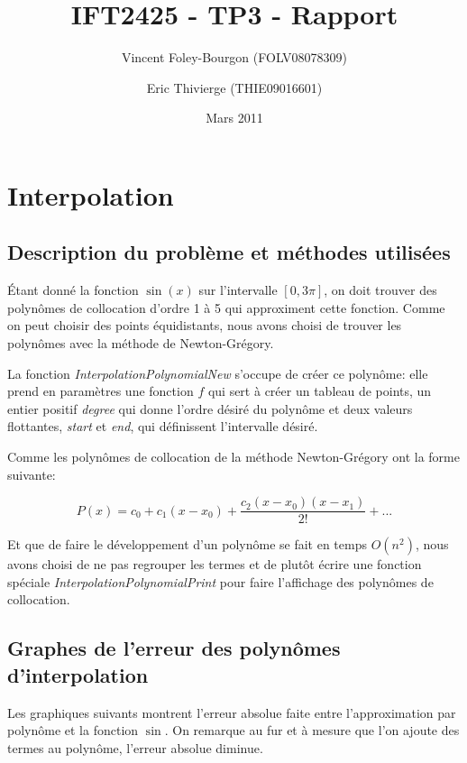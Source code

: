 \documentclass[10pt]{article}
\begin{document}
\title{IFT2425 - TP3 - Rapport}
\date{Mars 2011}
\author{Vincent Foley-Bourgon (FOLV08078309) \and
  Eric Thivierge (THIE09016601)}

\maketitle

\section{Interpolation}

\subsection{Description du problème et méthodes utilisées}

Étant donné la fonction $\sin(x)$ sur l'intervalle $[0, 3\pi]$, on doit
trouver des polynômes de collocation d'ordre 1 à 5 qui approximent
cette fonction.  Comme on peut choisir des points équidistants, nous
avons choisi de trouver les polynômes avec la méthode de
Newton-Grégory.

La fonction \emph{InterpolationPolynomialNew} s'occupe de créer ce
polynôme: elle prend en paramètres une fonction $f$ qui sert à créer
un tableau de points, un entier positif \emph{degree} qui donne
l'ordre désiré du polynôme et deux valeurs flottantes, \emph{start} et
\emph{end}, qui définissent l'intervalle désiré.

Comme les polynômes de collocation de la méthode Newton-Grégory ont la
forme suivante:

\[
P(x) = c_0 + c_1(x-x_0) + \frac{c_2(x-x_0)(x-x_1)}{2!} + ...
\]

Et que de faire le développement d'un polynôme se fait en temps
$O(n^2)$, nous avons choisi de ne pas regrouper les termes et de
plutôt écrire une fonction spéciale
\emph{InterpolationPolynomialPrint} pour faire l'affichage des
polynômes de collocation.

\subsection{Graphes de l'erreur des polynômes d'interpolation}

Les graphiques suivants montrent l'erreur absolue faite entre
l'approximation par polynôme et la fonction $\sin$.  On remarque au
fur et à mesure que l'on ajoute des termes au polynôme, l'erreur
absolue diminue.
\end{document}
